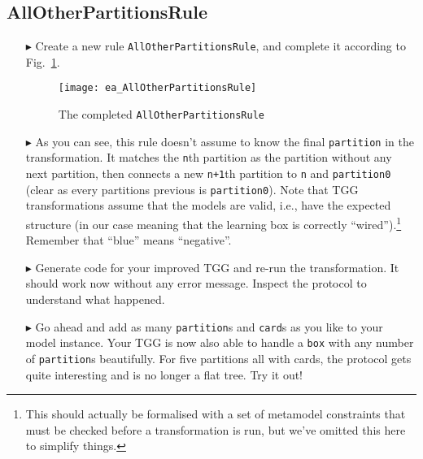 \newpage
\hypertarget{allCards vis}{}
\subsection{AllOtherPartitionsRule}
\genHeader

\begin{itemize}

\item[$\blacktriangleright$] Create a new rule \texttt{AllOtherPartitionsRule}, and complete it according to Fig.~\ref{fig:ea_AllOtherPartitionsRuleComplete}.


\begin{figure}[htbp]
\begin{center}
  \texttt{[image: ea\_AllOtherPartitionsRule]}
  \caption{The completed \texttt{AllOtherPartitionsRule}}
  \label{fig:ea_AllOtherPartitionsRuleComplete}
\end{center}
\end{figure}

\item[$\blacktriangleright$] As you can see, this rule doesn't assume to know the final \texttt{partition} in the transformation. 
It matches the \texttt{n}th partition as the partition without any next partition, then connects a new \texttt{n+1}th partition to \texttt{n} and \texttt{partition0} (clear as every partitions previous is \texttt{partition0}).
Note that TGG transformations assume that the models are valid, i.e., have the expected structure (in our case meaning that the learning box is correctly ``wired'').\footnote{This should actually be formalised with a set of metamodel constraints that must be checked before a transformation is run, but we've omitted this here to simplify things.}  
Remember that ``blue'' means ``negative''.

\item[$\blacktriangleright$] Generate code for your improved TGG and re-run the transformation. 
It should work now without any error message.
Inspect the protocol to understand what happened.

\item[$\blacktriangleright$] Go ahead and add as many \texttt{partition}s and \texttt{card}s as you like to your model instance.
Your TGG is now also able to handle a \texttt{box} with any number of \texttt{partition}s beautifully.
For five partitions all with cards, the protocol gets quite interesting and is no longer a flat tree.
Try it out! 

\end{itemize}



